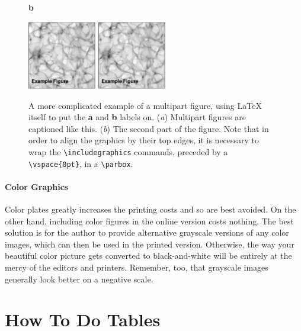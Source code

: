 \documentclass[proceedings, preprint]{rmaa}
\newcommand{\CS}[1]{\texttt{\textbackslash #1}}
\begin{document}
\begin{figure}[!t]
  \hspace*{\columnwidth}\hspace*{\columnsep}%
  \textbf{b}\\[-0.7\baselineskip]
  \parbox[t]{\textwidth}{%
     \vspace{0pt}
     \includegraphics[width=\columnwidth,height=3cm]{example-fig}%
     \hfill%
     \includegraphics[width=\columnwidth,height=3cm]{example-fig}
     }
  \caption{A more complicated example of a multipart
    figure, using \LaTeX{} itself to put the \textbf{a} and \textbf{b}
    labels on. (\textit{a}) Multipart figures are captioned like this.
    (\textit{b}) The second part of the figure.  Note that in order to
    align the graphics by their top edges, it is necessary to wrap the
    \CS{includegraphics} commands, preceded by a \CS{vspace\{0pt\}},
    in a \CS{parbox}.  }
  \label{fig:widefig2}
\end{figure}


\paragraph{Color Graphics}

Color plates greatly increases the printing costs and so are best
avoided. On the other hand, including color figures in the online
version costs nothing. The best solution is for the author to provide
alternative grayscale versions of any color images, which can then be
used in the printed version. Otherwise, the way your beautiful color
picture gets converted to black-and-white will be entirely at the
mercy of the editors and printers. Remember, too, that grayscale
images generally look better on a negative scale.

\section{How To Do Tables}
\label{sec:how-do-tables}
\end{document}
